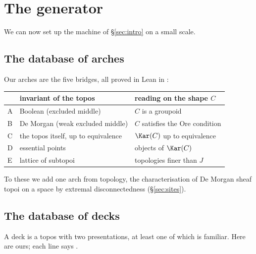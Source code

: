 \section{The generator}\label{sec:generator}

We can now set up the machine of \S\ref{sec:intro} on a small scale.

\subsection{The database of arches}

Our arches are the five bridges, all proved in Lean in \lp{}:

\begin{center}\small
\begin{tabularx}{\linewidth}{l>{\raggedright\arraybackslash}X>{\raggedright\arraybackslash}X}
\toprule
& invariant of the topos & reading on the shape $C$\\
\midrule
A & Boolean (excluded middle) & $C$ is a groupoid\\
B & De Morgan (weak excluded middle) & $C$ satisfies the Ore condition\\
C & the topos itself, up to equivalence & $\Kar(C)$ up to equivalence\\
D & essential points & objects of $\Kar(C)$\\
E & lattice of subtopoi & topologies finer than $J$\\
\bottomrule
\end{tabularx}
\end{center}

To these we add one arch from topology, the characterisation of De Morgan sheaf topoi on a space by extremal disconnectedness (\S\ref{sec:sites}).

\subsection{The database of decks}

A deck is a topos with two presentations, at least one of which is familiar. Here are ours; each line says .

